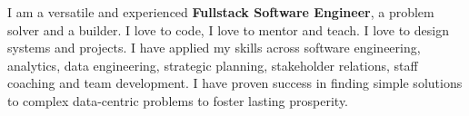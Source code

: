 
\begin{cvsummary}
  \summary
    {I am a versatile and experienced \textbf{Fullstack Software Engineer}, a problem solver and a builder. I love to code, I love to mentor and teach. I love to design systems and projects. I have applied my skills across software engineering, analytics, data engineering, strategic planning, stakeholder relations, staff coaching and team development. I have proven success in finding simple solutions to complex data-centric problems to foster lasting prosperity.}
\end{cvsummary}
